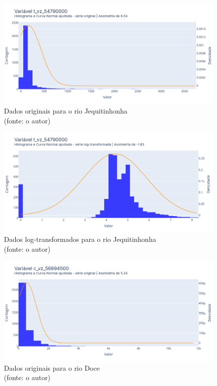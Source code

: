 \begin{figure}[!h]
	\centering
	\includegraphics[scale=0.33]{Figuras/jequiti/jequitinhonha_antes_log.png}
	\caption{Dados originais para o rio Jequitinhonha\\(fonte: o autor)}
	\label{fig:jequitinhonha_antes_log}
\end{figure}

\begin{figure}[!h]
	\centering
	\includegraphics[scale=0.33]{Figuras/jequiti/jequitinhonha_depois_log.png}
	\caption{Dados log-transformados para o rio Jequitinhonha\\(fonte: o autor)}
	\label{fig:jequitinhonha_depois_log}
\end{figure}

\begin{figure}[!h]
	\centering
	\includegraphics[scale=0.33]{Figuras/rio_doce/rio_doce_antes_log.png}
	\caption{Dados originais para o rio Doce\\(fonte: o autor)}
	\label{fig:rio_doce_antes_log}
\end{figure}

